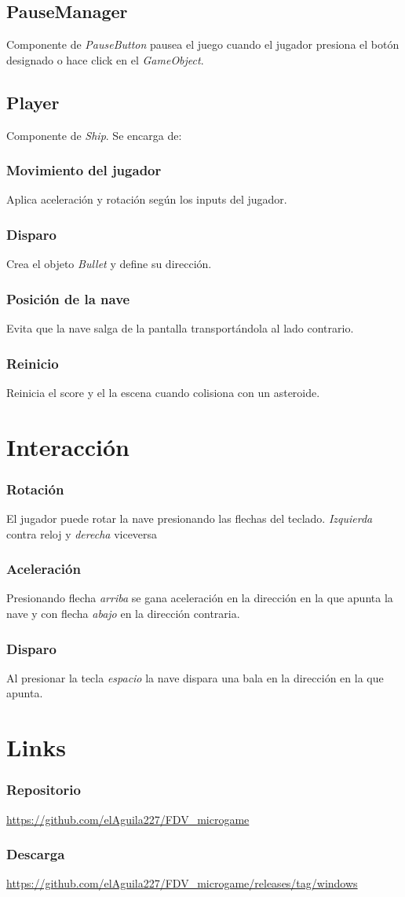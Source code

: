 \documentclass[journal]{IEEEtran}
\begin{document}
\subsection*{PauseManager}
Componente de \textit{PauseButton} pausea el juego cuando el jugador presiona
el botón designado o hace click en el \textit{GameObject}.

\subsection*{Player}
Componente de \textit{Ship}. Se encarga de:

\subsubsection*{Movimiento del jugador}
Aplica aceleración y rotación según los inputs del jugador.
\subsubsection*{Disparo}
Crea el objeto \textit{Bullet} y define su dirección.
\subsubsection*{Posición de la nave}
Evita que la nave salga de la pantalla transportándola al lado contrario.
\subsubsection*{Reinicio}
Reinicia el score y el la escena cuando colisiona con un asteroide.


\section*{Interacción}
\subsubsection*{Rotación}
El jugador puede rotar la nave presionando las flechas del teclado. \textit{Izquierda}
contra reloj y \textit{derecha} viceversa
\subsubsection*{Aceleración}
Presionando flecha \textit{arriba} se gana aceleración en la dirección en la que apunta
la nave y con flecha \textit{abajo} en la dirección contraria.
\subsubsection*{Disparo}
Al presionar la tecla \textit{espacio} la nave dispara una bala en la dirección en la
que apunta.

\vfill\break

\null\vfill

\section*{Links}
\raggedright
\subsubsection*{Repositorio}
\url{https://github.com/elAguila227/FDV_microgame}
\subsubsection*{Descarga}
\url{https://github.com/elAguila227/FDV_microgame/releases/tag/windows}
\end{document}

